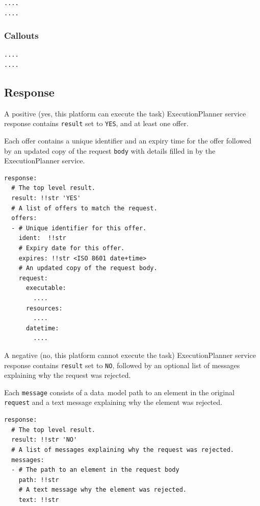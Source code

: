 \documentclass[11pt,a4paper]{ivoa}
\newcommand{\datamodel} {data~model}
\newcommand{\execplanner} {ExecutionPlanner}
\newcommand{\codeword}[1] {\texttt{#1}}
\begin{document}
\begin{lstlisting}[]
....
....
\end{lstlisting}

\subsubsection{Callouts}
\label{datamodel-callouts}

\begin{lstlisting}[]
....
....
\end{lstlisting}




\subsection{Response}
\label{datamodel-response}

A positive (yes, this platform can execute the task) \execplanner{} service response contains \codeword{result}
set to \codeword{YES}, and at least one offer.

Each offer contains a unique identifier and an expiry time for the offer
followed by an updated copy of the request \codeword{body} with details
filled in by the \execplanner{} service.

\begin{lstlisting}[]
response:
  # The top level result.
  result: !!str 'YES'
  # A list of offers to match the request.
  offers:
  - # Unique identifier for this offer.
    ident:  !!str
    # Expiry date for this offer.
    expires: !!str <ISO 8601 date+time>
    # An updated copy of the request body.
    request:
      executable:
        ....
      resources:
        ....
      datetime:
        ....
\end{lstlisting}

A negative (no, this platform cannot execute the task) \execplanner{} service response contains \codeword{result}
set to \codeword{NO}, followed by an optional list of messages
explaining why the request was rejected.

Each \codeword{message} consists of a \datamodel{} path to an element in the original
\codeword{request} and a text message explaining why the element was rejected.

\begin{lstlisting}[]
response:
  # The top level result.
  result: !!str 'NO'
  # A list of messages explaining why the request was rejected.
  messages:
  - # The path to an element in the request body
    path: !!str
    # A text message why the element was rejected.
    text: !!str
\end{lstlisting}
\end{document}
